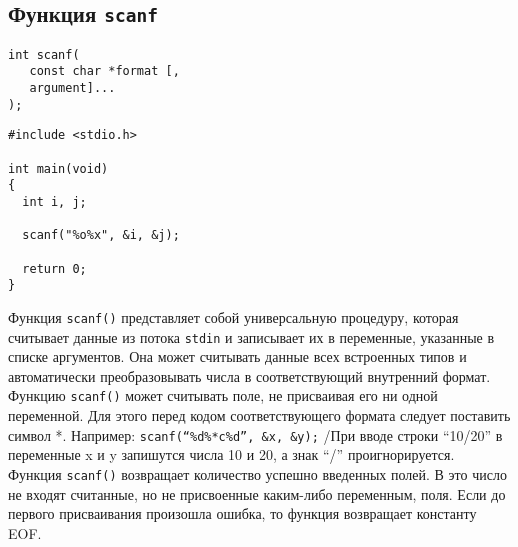 \documentclass {article}
\begin{document}
\subsection{Функция \texttt{scanf}}
\begin{lstlisting}[caption=Синтаксис]
int scanf(  
   const char *format [,  
   argument]...   
);  
\end{lstlisting}
\begin{lstlisting}[caption=Пример]
#include <stdio.h>

int main(void)
{
  int i, j;

  scanf("%o%x", &i, &j);

  return 0;
}
\end{lstlisting}
Функция \texttt{scanf()} представляет собой универсальную процедуру, которая считывает данные из потока \texttt{stdin} и записывает их в переменные, указанные в списке аргументов. Она может считывать данные всех встроенных типов и автоматически преобразовывать числа в соответствующий внутренний формат.
Функцию \texttt{scanf()} может считывать поле, не присваивая его ни одной переменной. Для этого перед кодом соответствующего формата следует поставить символ *. Например:
\texttt{scanf(``\%d\%*c\%d}\texttt{'', }\texttt{\&x, \&y);}     /При вводе строки ``10/20'' в переменные x и y запишутся числа 10 и 20, а знак ``/'' проигнорируется.
Функция \texttt{scanf()} возвращает количество успешно введенных полей. В это число не входят считанные, но не присвоенные каким-либо переменным, поля. Если до первого присваивания произошла ошибка, то функция возвращает константу EOF.
\end{document}
